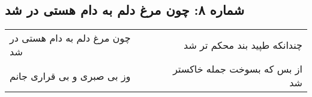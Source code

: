 \begin{center}
\section*{شماره ۸: چون مرغ دلم به دام هستی در شد}
\label{sec:008}
\begin{longtable}{l p{0.5cm} r}
چون مرغ دلم به دام هستی در شد
&&
چندانکه طپید بند محکم تر شد
\\
وز بی صبری و بی قراری جانم
&&
از بس که بسوخت جمله خاکستر شد
\\
\end{longtable}
\end{center}
